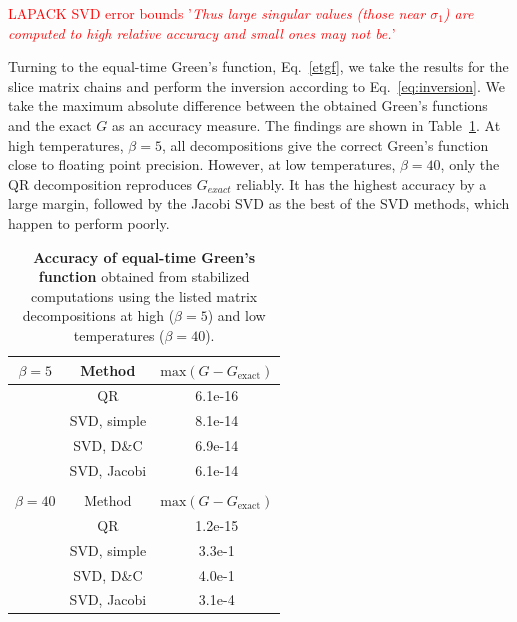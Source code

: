 \documentclass[%
 reprint,
superscriptaddress,
showpacs,
 amsmath,amssymb,
 aps,
 prb,
longbibliography,
]{revtex4-1}
\begin{document}
\textcolor{red}{LAPACK SVD error bounds\cite{errorbounds} '\textit{Thus large singular values (those near $\sigma_1$) are computed to high relative accuracy and small ones may not be.}'}


Turning to the equal-time Green's function, Eq.~\eqref{etgf}, we take the results for the slice matrix chains and perform the inversion according to Eq.~\eqref{eq:inversion}. We take the maximum absolute difference between the obtained Green's functions and the exact $G$ as an accuracy measure. The findings are shown in Table~\ref{tbl:greens_accuracy}. At high temperatures, $\beta = 5$, all decompositions give the correct Green's function close to floating point precision. However, at low temperatures, $\beta = 40$, only the QR decomposition reproduces $G_{exact}$ reliably. It has the highest accuracy by a large margin, followed by the Jacobi SVD as the best of the SVD methods, which happen to perform poorly.

\begin{table}[b]
	\bgroup
	\def\arraystretch{1.25}%
	\begin{tabular}{ccc}
		$\beta = 5$ & Method & $\textrm{max}(G - G_{\textrm{exact}})$ \\
		\hline
		& QR & 6.1e-16 \\ 

		& SVD, simple & 8.1e-14 \\ 

		& SVD, D\&C & 6.9e-14 \\ 

		& SVD, Jacobi & 6.1e-14 \\ 
		\hline
		& \\ 
		$\beta = 40$ & Method & $\textrm{max}(G - G_{\textrm{exact}})$ \\
		\hline
		
		& QR & 1.2e-15 \\ 

		& SVD, simple & 3.3e-1 \\ 

		& SVD, D\&C & 4.0e-1 \\ 

		& SVD, Jacobi & 3.1e-4 \\ 
		\hline
	\end{tabular}
	\egroup
	\caption{\textbf{Accuracy of equal-time Green's function} obtained from stabilized computations using the listed matrix decompositions at high ($\beta = 5$) and low temperatures ($\beta = 40$). \label{tbl:greens_accuracy}}
\end{table}
\end{document}
